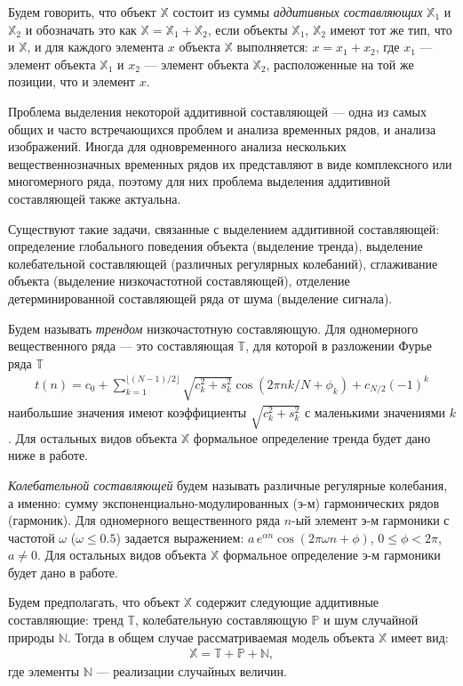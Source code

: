 \documentclass[specialist,
               substylefile = spbu.rtx,
               subf,href,colorlinks=true, 12pt]{disser}
\begin{document}
Будем говорить, что объект $\mathbb{X}$ состоит из суммы \textit{аддитивных составляющих} $\mathbb{X}_1$ и $\mathbb{X}_2$ и обозначать это как $\mathbb{X}=\mathbb{X}_1 + \mathbb{X}_2$, если объекты $\mathbb{X}_1$, $\mathbb{X}_2$ имеют тот же тип, что и $\mathbb{X}$, и для каждого элемента $x$ объекта $\mathbb{X}$ выполняется: $x = x_1 + x_2$, где $x_1$ --- элемент объекта $\mathbb{X}_1$ и $x_2$ --- элемент объекта $\mathbb{X}_2$, расположенные на той же позиции, что и элемент $x$.

Проблема выделения некоторой аддитивной составляющей --- одна из самых общих и часто встречающихся проблем и анализа временных рядов, и анализа изображений. Иногда для одновременного анализа нескольких вещественнозначных временных рядов их представляют в виде комплексного или многомерного ряда, поэтому для них проблема выделения аддитивной составляющей также актуальна.

Существуют такие задачи, связанные с выделением аддитивной составляющей: определение глобального поведения объекта (выделение тренда), выделение колебательной составляющей (различных регулярных колебаний), сглаживание объекта (выделение низкочастотной составляющей), отделение детерминированной составляющей ряда от шума (выделение сигнала).

Будем называть \textit{трендом} низкочастотную составляющую. Для одномерного вещественного ряда --- это составляющая $\mathbb{T}$, для которой в разложении Фурье ряда $\mathbb{T}$
\begin{gather*}
t(n) = c_0 + \sum_{k=1}^{\lfloor (N-1)/2 \rfloor}\sqrt{c_k^2 + s_k^2} \cos(2\pi n k /N + \phi_k) + c_{N/2} (-1)^k
\end{gather*}
 наибольшие значения имеют коэффициенты $\sqrt{c_k^2 + s_k^2}$ с маленькими значениями $k$. Для остальных видов объекта $\mathbb{X}$ формальное определение тренда будет дано ниже в работе. 

\textit{Колебательной составляющей} будем называть различные регулярные колебания, а именно: сумму экспоненциально-модулированных (э-м) гармонических рядов (гармоник).
Для одномерного вещественного ряда $n$-ый элемент э-м гармоники с частотой $\omega$ ($\omega \leqslant
0.5$) задается выражением:
$
a \,e^{\alpha n} \cos(2\pi \omega n  + \phi)
$, $0 \leqslant \phi < 2\pi$, $a \not = 0$.
 Для остальных видов объекта $\mathbb{X}$ формальное определение э-м гармоники будет дано в работе. 

Будем предполагать, что объект $\mathbb{X}$ содержит следующие аддитивные составляющие: тренд $\mathbb{T}$, колебательную составляющую $\mathbb{P}$ и шум случайной природы $\mathbb{N}$. Тогда в общем случае рассматриваемая модель объекта $\mathbb{X}$ имеет вид:
\begin{gather*}
\mathbb{X} = \mathbb{T}+\mathbb{P}+\mathbb{N},
\end{gather*}
где элементы $\mathbb{N}$ --- реализации случайных величин. 
\end{document}
